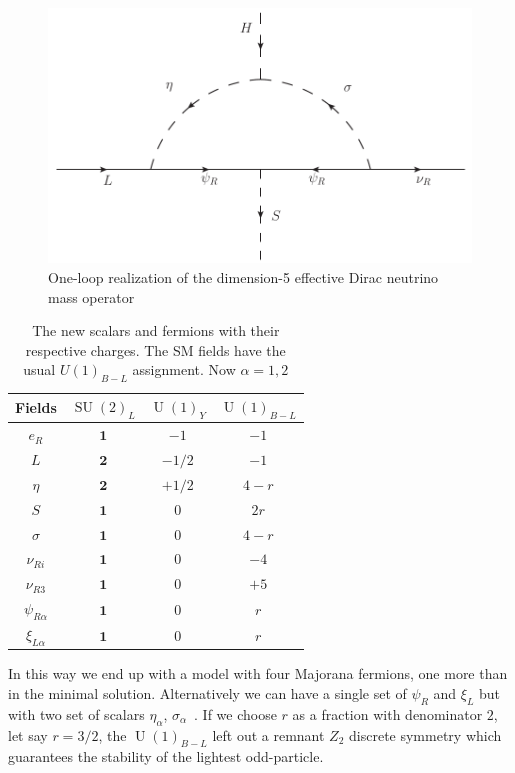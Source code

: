 \documentclass[12pt]{article}
\begin{document}
\begin{figure}
\centering
\includegraphics[scale=0.75]{Neutrino2.pdf}
\caption{One-loop realization of the dimension-5 effective Dirac neutrino mass operator }
\label{fig:ld5}
\end{figure}
%

\begin{table}
  \centering
  \begin{tabular}{|c|c|c|c|}
    \hline  
    Fields     & $\operatorname{SU}(2)_L$ & $\operatorname{U}(1)_Y $ & $\operatorname{U}(1)_{B-L}$ \\ \hline
    $e_R $  & $\boldsymbol{1}$& $-1$  &  $-1$ \\
     $L $  & $\boldsymbol{2}$& $-1/2$  &  $-1$ \\
    $\eta$  & $\boldsymbol{2}$ & $+1/2$  & $4-r$ \\
    $S$ & $\boldsymbol{1}$ & $0$  & $2r$ \\
    $\sigma$ & $\boldsymbol{1}$ & $0$ & $4-r$ \\
    \hline
     $\nu_{Ri}$ & $\boldsymbol{1}$ & $0$ & $-4$\\
    $\nu_{R3}$ & $\boldsymbol{1}$ & $0$ & $+5$\\
    $\psi_{R\alpha}$  & $\boldsymbol{1}$ & $0$ & $r$ \\\hline
    $\xi_{L\alpha}$  & $\boldsymbol{1}$ & $0$ & $r$ \\\hline
  \end{tabular}
  \caption{The new scalars and fermions with their respective charges. The SM fields have the usual $U(1)_{B-L}$ assignment. Now $\alpha=1,2$}
    \label{tab:partcont2}
\end{table}

In this way we end up with a model with four Majorana fermions, one more than in the minimal solution. Alternatively we can have a single set of $\psi_R$ and $\xi_L$ but with two set of scalars $\eta_\alpha$, $\sigma_{\alpha}$~\cite{Reig:2018mdk}. If we choose $r$ as a fraction with denominator $2$, let say $r=3/2$, the $\operatorname{U}(1)_{B-L}$ left out a remnant $Z_2$ discrete symmetry which guarantees the stability of the lightest odd-particle.
\end{document}
